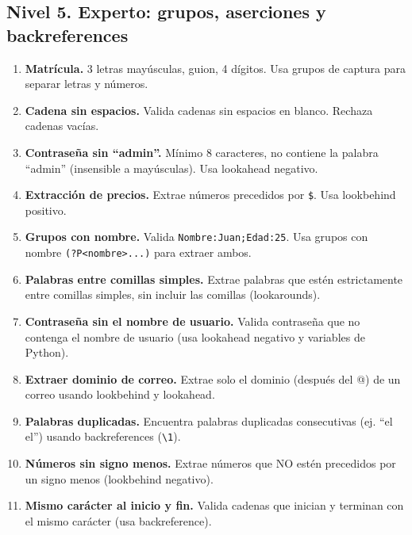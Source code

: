 \documentclass[12pt]{article}
\newcommand{\espacioalumno}{%
  \begin{flushleft}
  \vspace{5cm}
  \end{flushleft}
}
\begin{document}
{\subsection{Nivel 5. Experto: grupos, aserciones y backreferences}
\begin{enumerate}[label=\textbf{Ejercicio \arabic*.}, start=61]
\item \textbf{Matrícula.} 3 letras mayúsculas, guion, 4 dígitos. Usa grupos de captura para separar letras y números.
\espacioalumno
\item \textbf{Cadena sin espacios.} Valida cadenas sin espacios en blanco. Rechaza cadenas vacías.
  \vspace{4.5cm}
\item \textbf{Contraseña sin ``admin''.} Mínimo 8 caracteres, no contiene la palabra ``admin'' (insensible a mayúsculas). Usa lookahead negativo.
  \vspace{4.5cm}
\item \textbf{Extracción de precios.} Extrae números precedidos por \texttt{\$}. Usa lookbehind positivo.
\espacioalumno
\item \textbf{Grupos con nombre.} Valida \texttt{Nombre:Juan;Edad:25}. Usa grupos con nombre \texttt{(?P<nombre>...)} para extraer ambos.
\espacioalumno
\item \textbf{Palabras entre comillas simples.} Extrae palabras que estén estrictamente entre comillas simples, sin incluir las comillas (lookarounds).
  \vspace{4.5cm}
\item \textbf{Contraseña sin el nombre de usuario.} Valida contraseña que no contenga el nombre de usuario (usa lookahead negativo y variables de Python).
  \vspace{4.5cm}
\item \textbf{Extraer dominio de correo.} Extrae solo el dominio (después del @) de un correo usando lookbehind y lookahead.
  \vspace{4.5cm}
\item \textbf{Palabras duplicadas.} Encuentra palabras duplicadas consecutivas (ej. ``el el'') usando backreferences (\texttt{\textbackslash 1}).
\espacioalumno
\item \textbf{Números sin signo menos.} Extrae números que NO estén precedidos por un signo menos (lookbehind negativo).
  \vspace{4.5cm}
\item \textbf{Mismo carácter al inicio y fin.} Valida cadenas que inician y terminan con el mismo carácter (usa backreference).

\end{enumerate}}
\end{document}
